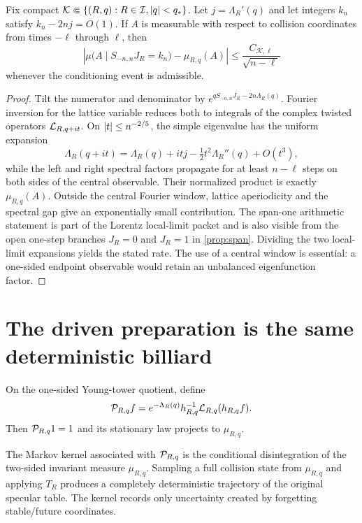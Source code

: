 \begin{theorem}\label{thm:gibbs-conditioning}
Fix compact $\mathcal K\Subset\{(R,q):R\in\mathcal I,\left\lvert q\right\rvert<q_*\}$.
Let $j=\Lambda_R'(q)$ and let integers $k_n$ satisfy
$k_n-2nj=O(1)$.  If $A$ is measurable with respect to collision coordinates
from times $-\ell$ through $\ell$, then
\[
 \left|
 \mu\bigl(A\mid S_{-n,n}J_R=k_n\bigr)-\mu_{R,q}(A)
 \right|
 \le \frac{C_{\mathcal K,\ell}}{\sqrt{n-\ell}}
\]
whenever the conditioning event is admissible.
\end{theorem}
\begin{proof}
Tilt the numerator and denominator by
$e^{qS_{-n,n}J_R-2n\Lambda_R(q)}$.  Fourier inversion for the lattice variable
reduces both to integrals of the complex twisted operators
$\mathcal L_{R,q+it}$.  On $\left\lvert t\right\rvert\le n^{-2/5}$, the simple eigenvalue has the
uniform expansion
\[
 \Lambda_R(q+it)=\Lambda_R(q)+itj-\tfrac12t^2\Lambda_R''(q)+O(t^3),
\]
while the left and right spectral factors propagate for at least $n-\ell$
steps on both sides of the central observable.  Their normalized product is
exactly $\mu_{R,q}(A)$.  Outside the central Fourier window, lattice
aperiodicity and the spectral gap give an exponentially small contribution.
The span-one arithmetic statement is part of the Lorentz local-limit packet and is also visible from the open one-step branches $J_R=0$ and $J_R=1$ in \cref{prop:span}.
Dividing the two local-limit expansions yields the stated rate.  The use of a
central window is essential: a one-sided endpoint observable would retain an
unbalanced eigenfunction factor.
\end{proof}

\section{The driven preparation is the same deterministic billiard}\label{sec:doob}
On the one-sided Young-tower quotient, define
\[
 \mathcal P_{R,q}f
 =e^{-\Lambda_R(q)}h_{R,q}^{-1}\mathcal L_{R,q}(h_{R,q}f).
\]
Then $\mathcal P_{R,q}1=1$ and its stationary law projects to $\mu_{R,q}$.

\begin{proposition}\label{prop:no-noise}
The Markov kernel associated with $\mathcal P_{R,q}$ is the conditional
disintegration of the two-sided invariant measure $\mu_{R,q}$.  Sampling a
full collision state from $\mu_{R,q}$ and applying $T_R$ produces a completely
deterministic trajectory of the original specular table.  The kernel records
only uncertainty created by forgetting stable/future coordinates.
\end{proposition}
